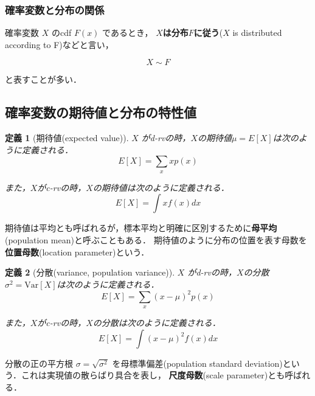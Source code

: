 \documentclass[12pt,a4j,draft]{jarticle}
\numberwithin{equation}{section}
\theoremstyle{break}
\newtheorem{definition}{定義}[section]
\newcommand{\V}{\text{Var}}
\begin{document}
\subsubsection{確率変数と分布の関係}
確率変数 $X$ のcdf $F(x)$ であるとき， \textbf{$X$は分布$F$に従う}($X$ is distributed according to F)などと言い，

\begin{equation}
    X \sim F
\end{equation}

と表すことが多い．
%
\subsection{確率変数の期待値と分布の特性値}

\begin{definition}[期待値(expected value)]
    \label{def:expected-value}
    $X$ がd-rvの時，$X$の期待値$\mu = E[X]$は次のように定義される．
    \begin{equation}
        E[X] = \sum_x xp(x)
    \end{equation}

    また，$X$がc-rvの時，$X$の期待値は次のように定義される．
    \begin{equation}
        E[X] = \int x f(x) dx
    \end{equation}
\end{definition}

期待値は平均とも呼ばれるが，標本平均と明確に区別するために\textbf{母平均}(population mean)と呼ぶこともある．
期待値のように分布の位置を表す母数を\textbf{位置母数}(location parameter)という．


\begin{definition}[分散(variance, population variance)]
    \label{def:variance}
        $X$ がd-rvの時，$X$の分散$\sigma^2 = \V [X]$は次のように定義される．
    \begin{equation}
        E[X] = \sum_x (x - \mu)^2 p(x)
    \end{equation}

    また，$X$がc-rvの時，$X$の分散は次のように定義される．
    \begin{equation}
        E[X] = \int (x - \mu)^2 f(x) dx
    \end{equation}
\end{definition}

分散の正の平方根 $\sigma = \sqrt{\sigma^2}$ を母標準偏差(population standard deviation)という．これは実現値の散らばり具合を表し，
\textbf{尺度母数}(scale parameter)とも呼ばれる．
\end{document}
